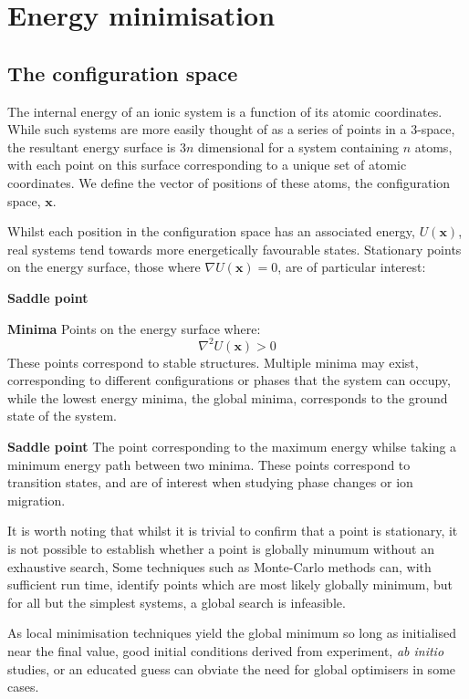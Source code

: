 \section{Energy minimisation}
\label{sec:minimization}
\subsection{The configuration space}
\label{sec:config}
The internal energy of an ionic system is a function of its atomic coordinates.
While such systems are more easily thought of as a series of points in a 3-space, the resultant energy surface is $3n$ dimensional for a system containing $n$ atoms, with each point on this surface corresponding to a unique set of atomic coordinates.
We define the vector of positions of these atoms, the configuration space, $\mathbf{x}$.

Whilst each position in the configuration space has an associated energy, $U(\mathbf{x})$, real systems tend towards more energetically favourable states.
Stationary points on the energy surface, those where $\nabla U(\mathbf{x}) = 0$, are of particular interest:
\begin{labeling}{\textbf{Saddle point}}
	\item [\textbf{Minima}] Points on the energy surface where:
	\begin{equation}
	\nabla^2 U(\mathbf{x}) > 0
	\end{equation}
	\noindent
	These points correspond to stable structures.
	Multiple minima may exist, corresponding to different configurations or phases that the system can occupy, while the lowest energy minima, the global minima, corresponds to the ground state of the system.
	\item [\textbf{Saddle point}] The point corresponding to the maximum energy whilse taking a minimum energy path between two minima.
	These points correspond to transition states, and are of interest when studying phase changes or ion migration.
\end{labeling}

It is worth noting that whilst it is trivial to confirm that a point is stationary, it is not possible to establish whether a point is globally minumum without an exhaustive search,
Some techniques such as Monte-Carlo methods can, with sufficient run time, identify points which are most likely globally minimum, but for all but the simplest systems, a global search is infeasible.\cite{Barnes1992}


As local minimisation techniques yield the global minimum so long as initialised near the final value, good initial conditions derived from experiment, \textit{ab initio} studies, or an educated guess can obviate the need for global optimisers in some cases.

